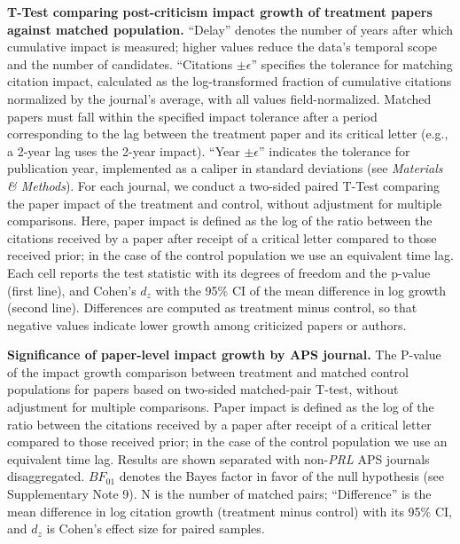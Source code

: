 \documentclass[12pt]{article} %
\def\methods{\textit{Materials \& Methods}}
\begin{document}
\clearpage
\begin{landscape}
\begin{table}[p]
\scriptsize
\centering
\caption{
\textbf{T-Test comparing post-criticism impact growth of treatment papers against matched population.}
``Delay'' denotes the number of years after which cumulative impact is measured; higher values reduce the data's temporal scope and the number of candidates. 
``Citations $\pm \epsilon$'' specifies the tolerance for matching citation impact, calculated as the log-transformed fraction of cumulative citations normalized by the journal's average, with all values field-normalized. 
Matched papers must fall within the specified impact tolerance after a period corresponding to the lag between the treatment paper and its critical letter (e.g., a 2-year lag uses the 2-year impact). 
``Year $\pm \epsilon$'' indicates the tolerance for publication year, implemented as a caliper in standard deviations (see \methods). 
For each journal, we conduct a two-sided paired T-Test comparing the paper impact of the treatment and control, without adjustment for multiple comparisons. Here, paper impact is defined as the log of the ratio between the citations received by a paper after receipt of a critical letter compared
to those received prior; in the case of the control population we use an equivalent time lag.
Each cell reports the test statistic with its degrees of freedom and the p-value (first line), and Cohen's $d_z$ with the 95\% CI of the mean difference in log growth (second line). Differences are computed as treatment minus control, so that negative values indicate lower growth among criticized papers or authors. 
}
\label{si:tab:paper-matched-ttest}
%
\end{table}
\end{landscape}


\begin{table}[ht]
\small
\centering
\caption{
    \textbf{Significance of paper-level impact growth by APS journal.}
    The P-value of the impact growth comparison between treatment and matched control populations for papers based on two-sided matched-pair T-test, without adjustment for multiple comparisons.
    Paper impact is defined as the log of the ratio between the citations received by a paper after receipt of a critical letter compared
    to those received prior; in the case of the control population we use an equivalent time lag.
    Results are shown separated with non-\textit{PRL} APS journals disaggregated.
$BF_{01}$ denotes the Bayes factor in favor of the null hypothesis (see Supplementary Note 9).
N is the number of matched pairs; ``Difference'' is the mean difference in log citation growth (treatment minus control) with its 95\% CI, and $d_z$ is Cohen's effect size for paired samples.
}
\label{si:table:aps-journal-ttests}
%
\end{table}
\end{document}

